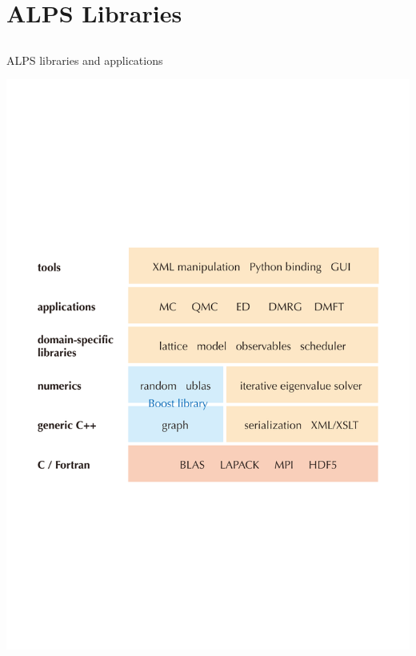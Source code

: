 \section{ALPS Libraries}

\subsection*{\redm\whiteb\greenb}
\begin{frame}[t,fragile]{ALPS libraries and applications}
  \begin{center}
    \includegraphics[height=0.65\textheight]{hierarchy.pdf}
  \end{center}
\end{frame}

